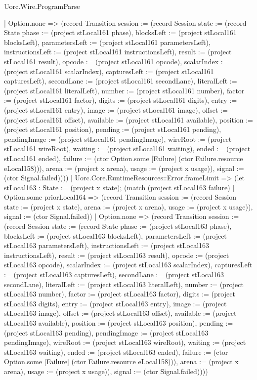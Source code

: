 \begin{lexlean}{Uorc.Wire.ProgramParse}
\begin{semanticmodule}
{        | Option.none => (record Transition {session := (record Session {state := (record State {phase := (project stLocal161 phase), blocksLeft := (project stLocal161 blocksLeft), parametersLeft := (project stLocal161 parametersLeft), instructionsLeft := (project stLocal161 instructionsLeft), result := (project stLocal161 result), opcode := (project stLocal161 opcode), scalarIndex := (project stLocal161 scalarIndex), capturesLeft := (project stLocal161 capturesLeft), secondLane := (project stLocal161 secondLane), literalLeft := (project stLocal161 literalLeft), number := (project stLocal161 number), factor := (project stLocal161 factor), digits := (project stLocal161 digits), entry := (project stLocal161 entry), image := (project stLocal161 image), offset := (project stLocal161 offset), available := (project stLocal161 available), position := (project stLocal161 position), pending := (project stLocal161 pending), pendingImage := (project stLocal161 pendingImage), wireRoot := (project stLocal161 wireRoot), waiting := (project stLocal161 waiting), ended := (project stLocal161 ended), failure := (ctor Option.some [Failure] (ctor Failure.resource eLocal158))}), arena := (project x arena), usage := (project x usage)}), signal := (ctor Signal.failed)})))
      | Uorc.Core.RuntimeResources::Error.frameLimit => (let stLocal163 : State := (project x state); (match (project stLocal163 failure)
        | Option.some priorLocal164 => (record Transition {session := (record Session {state := (project x state), arena := (project x arena), usage := (project x usage)}), signal := (ctor Signal.failed)})
        | Option.none => (record Transition {session := (record Session {state := (record State {phase := (project stLocal163 phase), blocksLeft := (project stLocal163 blocksLeft), parametersLeft := (project stLocal163 parametersLeft), instructionsLeft := (project stLocal163 instructionsLeft), result := (project stLocal163 result), opcode := (project stLocal163 opcode), scalarIndex := (project stLocal163 scalarIndex), capturesLeft := (project stLocal163 capturesLeft), secondLane := (project stLocal163 secondLane), literalLeft := (project stLocal163 literalLeft), number := (project stLocal163 number), factor := (project stLocal163 factor), digits := (project stLocal163 digits), entry := (project stLocal163 entry), image := (project stLocal163 image), offset := (project stLocal163 offset), available := (project stLocal163 available), position := (project stLocal163 position), pending := (project stLocal163 pending), pendingImage := (project stLocal163 pendingImage), wireRoot := (project stLocal163 wireRoot), waiting := (project stLocal163 waiting), ended := (project stLocal163 ended), failure := (ctor Option.some [Failure] (ctor Failure.resource eLocal158))}), arena := (project x arena), usage := (project x usage)}), signal := (ctor Signal.failed)})))
}
\end{semanticmodule}
\end{lexlean}
